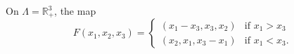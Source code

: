 On $\Lambda=\mathbb{R}^3_+$, the map
\[
F (x_1,x_2,x_3) = 
\begin{cases}
    (x_1-x_3, x_3, x_2) & \mbox{if } x_1 > x_3\\
    (x_2, x_1, x_3-x_1) & \mbox{if } x_1 < x_3.
\end{cases}
\]
